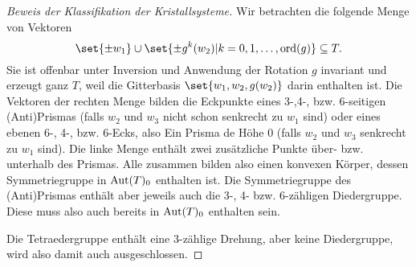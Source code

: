 \begin{proof}[Beweis der Klassifikation der Kristallsysteme]
Wir betrachten die folgende Menge von Vektoren
\[\set{\pm w_1}\cup\set{\pm g^k(w_2) | k=0,1,\ldots,\ord(g)} \subseteq T.\]
Sie ist offenbar unter Inversion und Anwendung der Rotation $g$ invariant und erzeugt ganz $T$, weil die Gitterbasis $\set{w_1,w_2,g(w_2)}$ darin enthalten ist. Die Vektoren der rechten Menge bilden die Eckpunkte eines 3-,4-, bzw. 6-seitigen (Anti)Prismas (falls $w_2$ und $w_3$ nicht schon senkrecht zu $w_1$ sind) oder eines ebenen 6-, 4-, bzw. 6-Ecks, also Ein Prisma de Höhe 0 (falls $w_2$ und $w_3$ senkrecht zu $w_1$ sind). Die linke Menge enthält zwei zusätzliche Punkte über- bzw. unterhalb des Prismas. Alle zusammen bilden also einen konvexen Körper, dessen Symmetriegruppe in $\operatorname{Aut}(T)_0$ enthalten ist. Die Symmetriegruppe des (Anti)Prismas enthält aber jeweils auch die 3-, 4- bzw. 6-zähligen Diedergruppe. Diese muss also auch bereits in $\operatorname{Aut}(T)_0$ enthalten sein.

Die Tetraedergruppe enthält eine 3-zählige Drehung, aber keine Diedergruppe, wird also damit auch ausgeschlossen.
\end{proof}